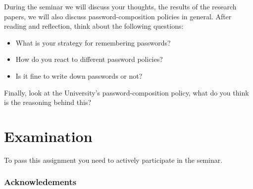 During the seminar we will discuss your thoughts, the results of the research 
papers, we will also discuss password-composition policies in general.
After reading and reflection, think about the following questions:
\begin{itemize}
  \item What is your strategy for remembering passwords?
  \item How do you react to different password policies?
  \item Is it fine to write down passwords or not?
\end{itemize}

Finally, look at the University's password-composition policy, what do you 
think is the reasoning behind this?


\section{Examination}
\label{sec:exam}
To pass this assignment you need to actively participate in the seminar.


\subsubsection*{Acknowledements}




\printbibliography{}
